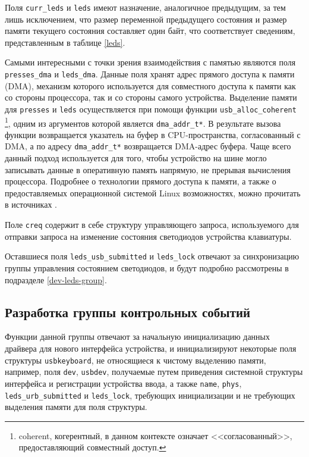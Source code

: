 Поля \texttt{curr\_leds} и \texttt{leds} имеют назначение, аналогичное
предыдущим, за тем лишь исключением, что размер переменной предыдущего состояния
и размер памяти текущего состояния составляет один байт, что соответствует 
сведениям, представленным в таблице \ref{leds}.

Самыми интересными с точки зрения взаимодействия с памятью являются
поля \texttt{presses\_dma} и \texttt{leds\_dma}.
Данные поля хранят адрес прямого доступа к памяти (DMA),
механизм которого используется для совместного доступа к памяти
как со стороны процессора, так и со стороны самого устройства.
Выделение памяти для \texttt{presses} и \texttt{leds} осуществляется
при помощи функции \texttt{usb\_alloc\_coherent}
\footnote{
    coherent, когерентный, в данном контексте означает
    <<согласованный>>, предоставляющий совместный доступ.
},
одним из аргументов которой является \texttt{dma\_addr\_t*}.
В результате вызова функции возвращается указатель на буфер в CPU-пространства,
согласованный с DMA, а по адресу \texttt{dma\_addr\_t*} возвращается DMA-адрес буфера.
Чаще всего данный подход используется для того,
чтобы устройство на шине могло записывать данные в оперативную память
напрямую, не прерывая вычисления процессора.
Подробнее о технологии прямого доступа к памяти,
а также о предоставляемых операционной системой Linux возможностях, 
можно прочитать в источниках \cite{dma, ldd3}.

Поле \texttt{creq} содержит в себе структуру управляющего
запроса, используемого для отправки запроса на изменение состояния светодиодов 
устройства клавиатуры.

Оставшиеся поля \texttt{leds\_usb\_submitted} и \texttt{leds\_lock}
отвечают за синхронизацию группы управления состоянием
светодиодов, и будут подробно рассмотрены в подразделе \ref{dev-leds-group}.

\subsection{Разработка группы контрольных событий}

Функции данной группы отвечают за начальную инициализацию 
данных драйвера для нового интерфейса устройства,
и инициализируют некоторые поля структуры \texttt{usbkeyboard},
не относящиеся к чистому выделению памяти,
например, поля \texttt{dev}, \texttt{usbdev}, получаемые
путем приведения системной структуры интерфейса и регистрации
устройства ввода, а также
\texttt{name}, \texttt{phys}, \texttt{leds\_urb\_submitted} и \texttt{leds\_lock},
требующих инициализации и не требующих выделения памяти для поля структуры.

